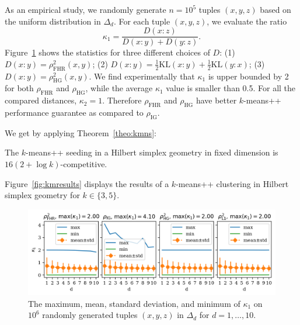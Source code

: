 \documentclass[graybox]{svmult}
\def\KL{\mathrm{KL}}
\begin{document}
As an empirical study, we randomly generate $n=10^5$ tuples $(x, y, z)$ 
based on the uniform distribution in $\Delta_d$. For each tuple $(x,y,z)$,
we evaluate the ratio
$$
\kappa_1 = \frac{D(x:z)}{D(x:y)+D(y:z)}.
$$
Figure~\ref{fig:kappa} shows the statistics for three different choices of
$D$: (1) $D(x:y)=\rho_{\mathrm{FHR}}^2(x,y)$; (2)
$D(x:y)=\frac{1}{2}\KL(x:y)+\frac{1}{2}\KL(y:x)$;
(3) $D(x:y)=\rho^2_{\mathrm{HG}}(x,y)$.
We find experimentally that $\kappa_1$ is upper bounded by 2 for both
$\rho_{\mathrm{FHR}}$ and $\rho_{\mathrm{HG}}$,
while the average $\kappa_1$ value is smaller than 0.5.
For all the compared distances, $\kappa_2=1$. Therefore $\rho_{\mathrm{FHR}}$
and $\rho_{\mathrm{HG}}$ have better $k$-means++ performance guarantee as compared 
to $\rho_{\mathrm{IG}}$.


We get by applying Theorem~\ref{theo:kmns}:
\begin{corollary}
The $k$-means++ seeding in a  Hilbert simplex geometry in fixed dimension is $16 (2+\log k)$-competitive.
\end{corollary}


Figure~\ref{fig:kmresults} displays the results of a $k$-means++ clustering in Hilbert simplex geometry for $k\in\{3,5\}$.

\begin{figure}
\centering
\includegraphics[width=\textwidth]{kappa}
\caption{The maximum, mean, standard deviation, and minimum
of $\kappa_1$ on $10^6$ randomly generated tuples $(x,y,z)$ in $\Delta_d$ for
$d=1,\dots,10$.}\label{fig:kappa}
\end{figure}
\end{document}
